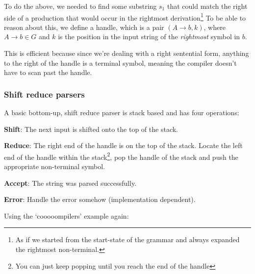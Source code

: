 To do the above, we needed to find some substring $s_1$ that could match the
right side of a production that would occur in the rightmost
derivation\footnote{As if we started from the start-state of the grammar and
always expanded the rightmost non-terminal.} To be able to reason about this, we
define a handle, which is a pair $(A \rightarrow b, k)$, where $A \rightarrow b
\in G$ and $k$ is the position in the input string of the \textit{rightmost} symbol in
$b$.

This is efficient because since we're dealing with a right sentential form,
anything to the right of the handle is a terminal symbol, meaning the compiler
doesn't have to scan past the handle.

\subsubsection{Shift reduce parsers}

A basic bottom-up, shift reduce parser is stack based and has four operations:

\begin{description}
  \item \textbf{Shift}: The next input is shifted onto the top of the stack.
  \item \textbf{Reduce}: The right end of the handle is on the top of the
  stack. Locate the left end of the handle within the stack\footnote{You can
  just keep popping until you reach the end of the handle}, pop the handle of
  the stack and push the appropriate non-terminal symbol.
  \item \textbf{Accept}: The string was parsed successfully.
  \item \textbf{Error}: Handle the error somehow (implementation dependent).
\end{description}

Using the `cooooompilers' example again:

